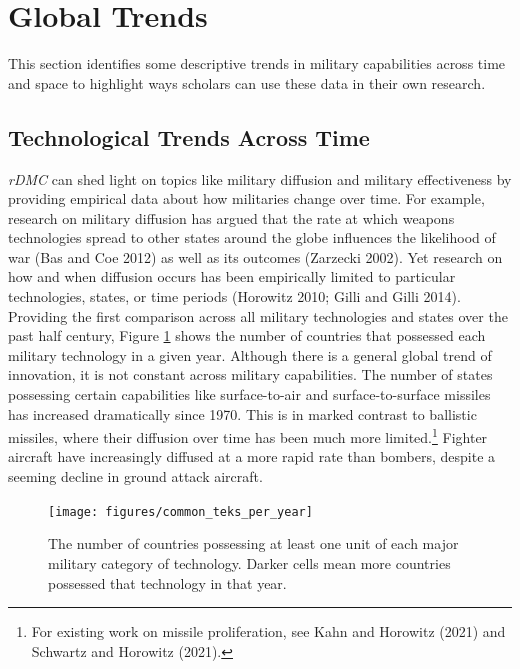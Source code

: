\documentclass[
]{article}
\begin{document}
\hypertarget{global-trends}{%
\section{Global Trends}\label{global-trends}}

This section identifies some descriptive trends in military capabilities across time and space to highlight ways scholars can use these data in their own research.

\hypertarget{technological-trends-across-time}{%
\subsection{Technological Trends Across Time}\label{technological-trends-across-time}}

\emph{rDMC} can shed light on topics like military diffusion and military effectiveness by providing empirical data about how militaries change over time. For example, research on military diffusion has argued that the rate at which weapons technologies spread to other states around the globe influences the likelihood of war (Bas and Coe 2012) as well as its outcomes (Zarzecki 2002). Yet research on how and when diffusion occurs has been empirically limited to particular technologies, states, or time periods (Horowitz 2010; Gilli and Gilli 2014). Providing the first comparison across all military technologies and states over the past half century, Figure \ref{fig:common-teks} shows the number of countries that possessed each military technology in a given year. Although there is a general global trend of innovation, it is not constant across military capabilities. The number of states possessing certain capabilities like surface-to-air and surface-to-surface missiles has increased dramatically since 1970. This is in marked contrast to ballistic missiles, where their diffusion over time has been much more limited.\footnote{For existing work on missile proliferation, see Kahn and Horowitz (2021) and Schwartz and Horowitz (2021).} Fighter aircraft have increasingly diffused at a more rapid rate than bombers, despite a seeming decline in ground attack aircraft.

\begin{figure}
\texttt{[image: figures/common\_teks\_per\_year]} \caption{The number of countries possessing at least one unit of each major military category of technology. Darker cells mean more countries possessed that technology in that year.}\label{fig:common-teks}
\end{figure}
\end{document}
